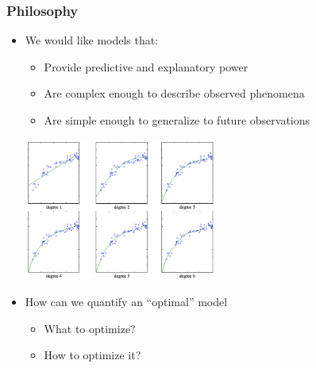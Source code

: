 \documentclass[xcolor=dvipsnames, 9pt]{beamer}
\begin{document}
\begin{frame}
  \frametitle{Philosophy}

    \begin{itemize}
      \item We would like models that:
        \begin{itemize}
          \item Provide predictive and explanatory power
          \item Are complex enough to describe observed phenomena
          \item Are simple enough to generalize to future observations
        \end{itemize}

    \begin{center}
      \includegraphics[width=0.5\textwidth]{regression.png}
    \end{center}


      \pause
      \item How can we quantify an ``optimal'' model
        \begin{itemize}
          \item What to optimize?
          \item How to optimize it?
        \end{itemize}

    \end{itemize}

\end{frame}
\end{document}
